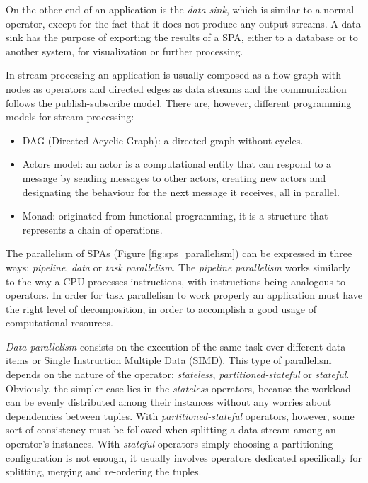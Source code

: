 \documentclass[ppgc,diss,english]{iiufrgs}
\begin{document}
On the other end of an application is the \emph{data sink}, which is similar to a normal operator, except for the fact that it does not produce any output streams. A data sink has the purpose of exporting the results of a SPA, either to a database or to another system, for visualization or further processing.


In stream processing an application is usually composed as a flow graph with nodes as operators and directed edges as data streams and the communication follows the publish-subscribe model. There are, however, different programming models for stream processing:

\begin{itemize}
\item DAG (Directed Acyclic Graph): a directed graph without cycles.
\item Actors model: an actor is a computational entity that can respond to a message by sending messages to other actors, creating new actors and designating the behaviour for the next message it receives, all in parallel.
\item Monad: originated from functional programming, it is a structure that represents a chain of operations.
\end{itemize}

The parallelism of SPAs (Figure \ref{fig:sps_parallelism}) can be expressed in three ways: \emph{pipeline}, \emph{data} or \emph{task parallelism}. The \emph{pipeline parallelism} works similarly to the way a CPU processes instructions, with instructions being analogous to operators. In order for task parallelism to work properly an application must have the right level of decomposition, in order to accomplish a good usage of computational resources.

\emph{Data parallelism} consists on the execution of the same task over different data items or Single Instruction Multiple Data (SIMD). This type of parallelism depends on the nature of the operator: \emph{stateless}, \emph{partitioned-stateful} or \emph{stateful}. Obviously, the simpler case lies in the \emph{stateless} operators, because the workload can be evenly distributed among their instances without any worries about dependencies between tuples. With \emph{partitioned-stateful} operators, however, some sort of consistency must be followed when splitting a data stream among an operator's instances. With \emph{stateful} operators simply choosing a partitioning configuration is not enough, it usually involves operators dedicated specifically for splitting, merging and re-ordering the tuples.
\end{document}
